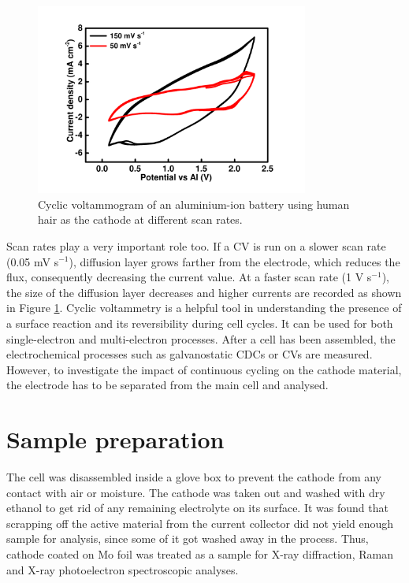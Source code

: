 \begin{figure}[tbh!]
\centering
\includegraphics[width=0.8\textwidth]{Figures/chap2fig/scanrate.pdf}
\caption{Cyclic voltammogram of an aluminium-ion battery using human hair as the cathode at different scan rates.}
\label{Figures/chap2fig:scanrate}
\end{figure}

Scan rates play a very important role too. If a CV is run on a slower scan rate (0.05 mV s$^{-1}$), diffusion layer grows farther from the electrode, which reduces the flux, consequently decreasing the current value. At a faster scan rate (1 V s$^{-1}$), the size of the diffusion layer decreases and higher currents are recorded as shown in Figure \ref{Figures/chap2fig:scanrate}. Cyclic voltammetry is a helpful tool in understanding the presence of a surface reaction and its reversibility during cell cycles. It can be used for both single-electron and multi-electron processes.  
After a cell has been assembled, the electrochemical processes such as galvanostatic CDCs or CVs are measured. However, to investigate the impact of continuous cycling on the cathode material, the electrode has to be separated from the main cell and analysed. 
\section*{Sample preparation}
The cell was disassembled inside a glove box to prevent the cathode from any contact with air or moisture. The cathode was taken out and washed with dry ethanol to get rid of any remaining electrolyte on its surface. It was found that scrapping off the active material from the current collector did not yield enough sample for analysis, since some of it got washed away in the process. Thus, cathode coated on Mo foil was treated as a sample for X-ray diffraction, Raman and X-ray photoelectron spectroscopic analyses.


